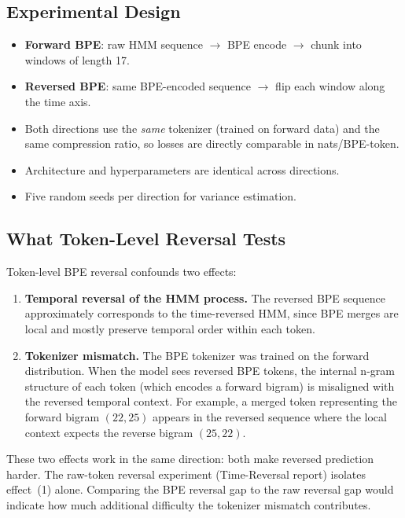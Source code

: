 \documentclass[11pt]{article}
\begin{document}
\subsection{Experimental Design}

\begin{itemize}
\item \textbf{Forward BPE}: raw HMM sequence $\to$ BPE encode $\to$ chunk into windows of length 17.
\item \textbf{Reversed BPE}: same BPE-encoded sequence $\to$ flip each window along the time axis.
\item Both directions use the \emph{same} tokenizer (trained on forward data) and the same compression ratio, so losses are directly comparable in nats/BPE-token.
\item Architecture and hyperparameters are identical across directions.
\item Five random seeds per direction for variance estimation.
\end{itemize}

\subsection{What Token-Level Reversal Tests}

Token-level BPE reversal confounds two effects:

\begin{enumerate}
\item \textbf{Temporal reversal of the HMM process.}  The reversed BPE sequence approximately corresponds to the time-reversed HMM, since BPE merges are local and mostly preserve temporal order within each token.

\item \textbf{Tokenizer mismatch.}  The BPE tokenizer was trained on the forward distribution.  When the model sees reversed BPE tokens, the internal n-gram structure of each token (which encodes a forward bigram) is misaligned with the reversed temporal context.  For example, a merged token representing the forward bigram $(22, 25)$ appears in the reversed sequence where the local context expects the reverse bigram $(25, 22)$.
\end{enumerate}

These two effects work in the same direction: both make reversed prediction harder.  The raw-token reversal experiment (Time-Reversal report) isolates effect~(1) alone.  Comparing the BPE reversal gap to the raw reversal gap would indicate how much additional difficulty the tokenizer mismatch contributes.
\end{document}
